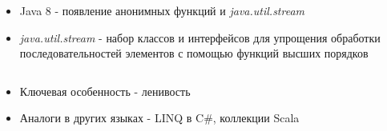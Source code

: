 \begin{frame}
\frametitle{\insertsection} 
\framesubtitle{\insertsubsection}
\begin{itemize}
	\item Java 8 - появление анонимных функций и \textit{java.util.stream}
	\item \textit{java.util.stream} - набор классов и интерфейсов для упрощения обработки последовательностей элементов с помощью функций высших порядков
	\inputminted{java}{code/StreamsExample.java}
	\item Ключевая особенность - ленивость
	\item Аналоги в других языках - LINQ в C\#, коллекции Scala
\end{itemize}
\end{frame}